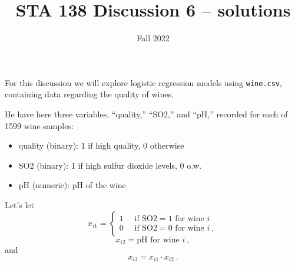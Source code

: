 \documentclass[
]{article}
\title{STA 138 Discussion 6 -- solutions}
\author{Fall 2022}
\date{}
\begin{document}
\maketitle

For this discussion we will explore logistic regression models using
\verb+wine.csv+, containing data regarding the quality of wines.

He have here three variables, ``quality,'' ``SO2,'' and ``pH,'' recorded
for each of 1599 wine samples:

\begin{itemize}
\item quality (binary): 1 if high quality, 0 otherwise
\item SO2 (binary): 1 if high sulfur dioxide levels, 0 o.w.
\item pH (numeric): pH of the wine
\end{itemize}

Let's let \[ x_{i1} = \begin{cases}
1 \quad \text{ if SO2}=1\text{ for wine $i$}\\ 
0 \quad \text{ if SO2}=0\text{ for wine $i$}\ ,
\end{cases}\] \[ x_{i2} = \text{pH}\text{ for wine $i$}\ ,\] and
\[x_{i3} = x_{i1}\cdot x_{i2}\ . \]
\end{document}
